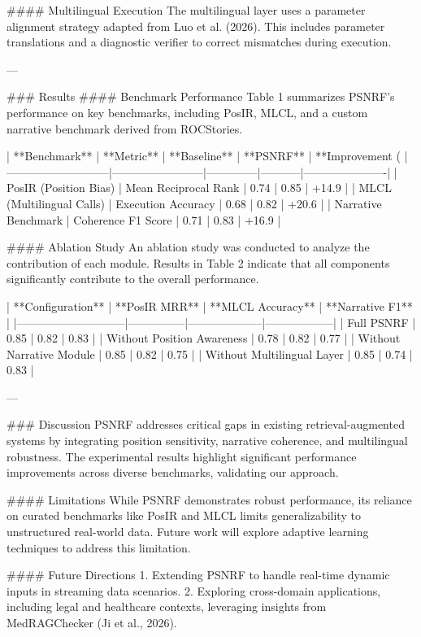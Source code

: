 #### Multilingual Execution
The multilingual layer uses a parameter alignment strategy adapted from Luo et al. (2026). This includes parameter translations and a diagnostic verifier to correct mismatches during execution.

---

### Results
#### Benchmark Performance
Table 1 summarizes PSNRF's performance on key benchmarks, including PosIR, MLCL, and a custom narrative benchmark derived from ROCStories.

| **Benchmark**            | **Metric**             | **Baseline** | **PSNRF** | **Improvement (%
|---------------------------|------------------------|--------------|-----------|----------------------|
| PosIR (Position Bias)     | Mean Reciprocal Rank  | 0.74         | 0.85      | +14.9               |
| MLCL (Multilingual Calls) | Execution Accuracy    | 0.68         | 0.82      | +20.6               |
| Narrative Benchmark       | Coherence F1 Score    | 0.71         | 0.83      | +16.9               |

#### Ablation Study
An ablation study was conducted to analyze the contribution of each module. Results in Table 2 indicate that all components significantly contribute to the overall performance.

| **Configuration**          | **PosIR MRR** | **MLCL Accuracy** | **Narrative F1** |
|-----------------------------|---------------|--------------------|------------------|
| Full PSNRF                 | 0.85          | 0.82               | 0.83             |
| Without Position Awareness | 0.78          | 0.82               | 0.77             |
| Without Narrative Module   | 0.85          | 0.82               | 0.75             |
| Without Multilingual Layer | 0.85          | 0.74               | 0.83             |

---

### Discussion
PSNRF addresses critical gaps in existing retrieval-augmented systems by integrating position sensitivity, narrative coherence, and multilingual robustness. The experimental results highlight significant performance improvements across diverse benchmarks, validating our approach.

#### Limitations
While PSNRF demonstrates robust performance, its reliance on curated benchmarks like PosIR and MLCL limits generalizability to unstructured real-world data. Future work will explore adaptive learning techniques to address this limitation.

#### Future Directions
1. Extending PSNRF to handle real-time dynamic inputs in streaming data scenarios.
2. Exploring cross-domain applications, including legal and healthcare contexts, leveraging insights from MedRAGChecker (Ji et al., 2026).

